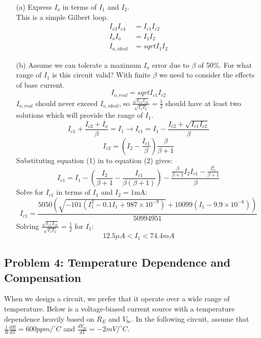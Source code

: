 \documentclass[11pt,twoside]{article}
\begin{document}
\begin{enumerate}
	\item[(a)] Express $I_o$ in terms of $I_1$ and $I_2$.\\
 This is a simple Gilbert loop.
	\begin{align*}
	I_{c3}I_{c4}&=I_{c1}I_{c2}\\
	I_oI_o&=I_1I_2\\
	I_{o,ideal}&=sqrt{I_1I_2}
	\end{align*}
	\item[(b)] Assume we can tolerate a maximum $I_o$ error due to $\beta$ of 50\%.  For what range of $I_1$ is this circuit valid?
\vspace{1ex}
With finite $\beta$ we need to consider the effects of base current.
\begin{equation*}
I_{o,real} = sqrt{I_{c1}I_{c2}}
\end{equation*}
$I_{o,real}$ should never exceed $I_{o,ideal}$, so 
$\frac{\sqrt{I_{c1}I_{c2}}}{\sqrt{I_1I_2}}=\frac{1}{2}$ should have at least two solutions
which will provide the range of $I_1$.
\begin{equation}
I_{c1}+\frac{I_{c2}+I_o}{\beta}=I_1 \rightarrow 
I_{c1}=I_1-\frac{I_{c2}+\sqrt{I_{c1}I_{c2}}}{\beta}
\end{equation}
\begin{equation}
I_{c2} = (I_2-\frac{I_{c1}}{\beta})\frac{\beta}{\beta+1}
\end{equation}
Substituting equation (1) in to equation (2) gives:
\begin{equation*}
I_{c1}=I_1-(\frac{I_2}{\beta+1}-\frac{I_{c1}}{\beta(\beta+1)})-
\frac{\frac{\beta}{\beta+1}I_2I_{c1}-\frac{I_{c1}^2}{\beta+1}}{\beta}
\end{equation*}
Solve for $I_{c1}$ in terms of $I_1$ and $I_2=1$mA:
\begin{equation*}
I_{c1}=\frac{5050(\sqrt{-101(I_1^2-0.1I_1+987\times10^{-9})}+10099(I_1-9.9\times10^{-6}))}{50994951}
\end{equation*}
Solving $\frac{\sqrt{I_{c1}I_{c2}}}{\sqrt{I_1I_2}}=\frac{1}{2}$ for $I_1$:
\begin{equation*}
12.5\mu A < I_1 < 74.4mA
\end{equation*}
\end{enumerate}

\subsection*{Problem 4: Temperature Dependence and Compensation}
When we design a circuit, we prefer that it operate over a wide range of temperature.
Below is a voltage-biased current source with a temperature dependence heavily based on $R_E$ and $V_{be}$.
In the following circuit, assume that $\frac{1}{R} \frac{dR}{dT}=600ppm/^{\circ}C$ and $\frac{dV_{be}}{dT}=-2mV/^{\circ}C$. \\
\vspace{1ex}
\end{document}
